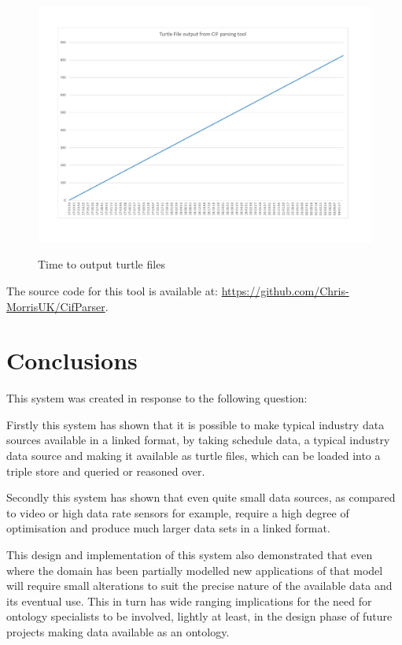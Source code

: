  \begin{figure}
\myfloatalign
{\includegraphics[width=\linewidth]{gfx/scheduleProcessing}} 
\caption{Time to output turtle files}
\label{fig:cifparsing}
\end{figure}

The source code for this tool is available at: \url{https://github.com/Chris-MorrisUK/CifParser}.

\section{Conclusions}

This system was created in response to the following question: \textit{\QuestionOtherData}

Firstly this system has shown that it is possible to make typical industry data sources available in a linked format, by taking schedule data, a typical industry data source and making it available as turtle files, which can be loaded into a triple store and queried or reasoned over. 

Secondly this system has shown that even quite small data sources, as compared to video or high data rate sensors for example, require a high degree of optimisation and produce much larger data sets in a linked format. 

This design and implementation of this system also demonstrated that even where the domain has been partially modelled new applications of that model will require small alterations to suit the precise nature of the available data and its eventual use. This in turn has wide ranging implications for the need for ontology specialists to be involved, lightly at least, in the design phase of future projects making data available as an ontology.

